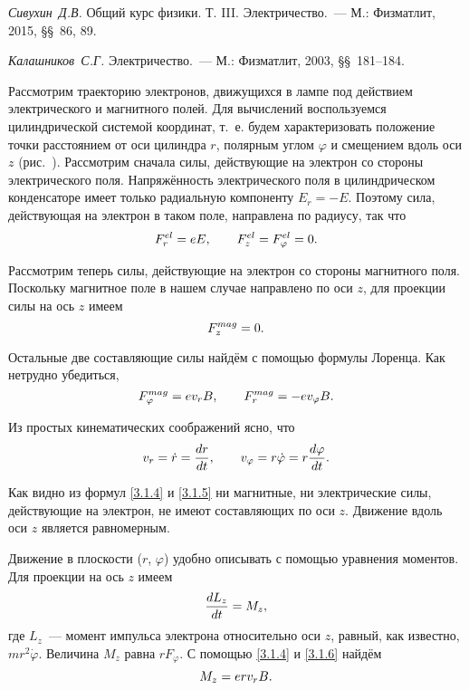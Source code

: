 \begin{lab:literature}
\item{ \emph {Сивухин~Д.В.} Общий курс физики. Т. III. Электричество.~--- М.: Физматлит, 2015, \S\S~86, 89.}
\item{ \emph {Калашников~С.Г.} Электричество.~--- М.: Физматлит, 2003, \S\S~181--184.}
\end{lab:literature}





Рассмотрим траекторию электронов, движущихся в лампе под действием электрического и магнитного полей. Для вычислений воспользуемся цилиндрической системой координат, т.~е. будем характеризовать положение точки расстоянием от оси цилиндра $r$, полярным углом $\varphi$ и смещением вдоль оси $z$ (рис.~). Рассмотрим сначала силы, действующие на электрон со стороны электрического поля. Напряжённость электрического поля в цилиндрическом конденсаторе имеет только радиальную компоненту $E_r=-E$. Поэтому сила, действующая на электрон в таком поле, направлена по радиусу, так что
\begin{equation}
	F_r^{el}=eE,\qquad F_z^{el}=F_{\varphi}^{el}=0.
	\eqmark{3.1.4}
\end{equation}

Рассмотрим теперь силы, действующие на электрон со стороны магнитного поля. Поскольку магнитное поле в нашем случае
направлено по оси $z$, для проекции силы на ось $z$ имеем
\begin{equation}
	F_z^{mag}=0.
	\eqmark{3.1.5}
\end{equation}

Остальные две составляющие силы найдём с помощью формулы Лоренца. Как нетрудно убедиться,
\begin{equation}
	F_{\varphi}^{mag}=ev_rB,\qquad F_{r}^{mag}=-ev_{\varphi}B.
	\eqmark{3.1.6}
\end{equation}

Из простых кинематических соображений ясно, что
\begin{equation}
	v_r=\dot{r}=\frac{dr}{dt},\qquad v_{\varphi}=r\dot{\varphi}=r\frac{d\varphi}{dt}.
	\eqmark{3.1.7}
\end{equation}

Как видно из формул \eqref{3.1.4} и \eqref{3.1.5} ни магнитные, ни электрические силы, действующие на электрон, не имеют составляющих по оси $z$. Движение вдоль оси $z$ является равномерным.

Движение в плоскости ($r$, $\varphi$) удобно описывать с помощью уравнения моментов. Для проекции на ось $z$ имеем
\begin{equation}
	\frac{dL_{z}}{dt}=M_z,
	\eqmark{3.1.8}
\end{equation}
где $L_{z}$~--- момент импульса электрона относительно оси $z$, равный, как известно, $mr^2\dot{\varphi}$. Величина $M_z$ равна $rF_{\varphi}$. С помощью \eqref{3.1.4} и \eqref{3.1.6} найдём
\begin{equation}
	M_z=erv_rB.
	\eqmark{3.1.9}
\end{equation}


